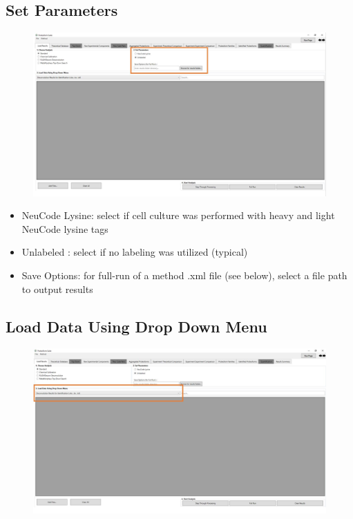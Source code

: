 \pagebreak
\subsection{Set Parameters}

\begin{figure}[htbp]
\centering
\includegraphics[scale=0.4]{figures/load_results_2.jpg}
\end{figure}

\begin{itemize}
	\item NeuCode Lysine: select if cell culture was performed with heavy and light NeuCode lysine tags 
	\item Unlabeled : select if no labeling was utilized (typical)
	\item Save Options: for full-run of a method .xml file (see below), select a file path to output results
\end{itemize}

\subsection{Load Data Using Drop Down Menu}

\begin{figure}[htbp]
\centering
\includegraphics[scale=0.4]{figures/load_results_3.jpg}
\end{figure}

